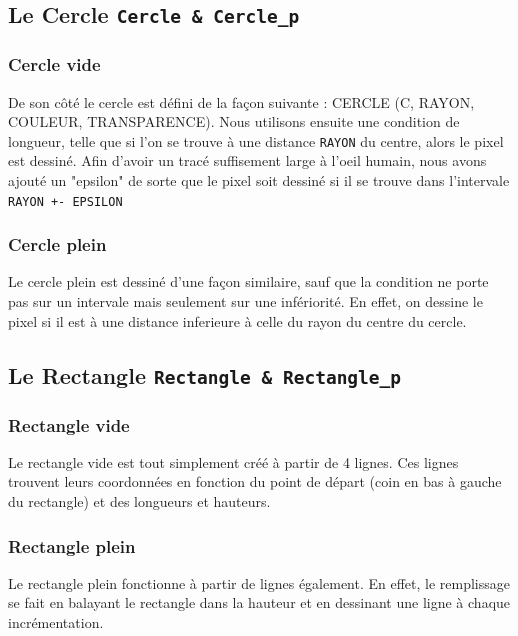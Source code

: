 \documentclass[11pt]{article}
\begin{document}
\subsection{Le Cercle \texttt{Cercle \& Cercle\_p}}

\subsubsection{Cercle vide}

De son côté le cercle est défini de la façon suivante : CERCLE (C, RAYON, COULEUR, TRANSPARENCE). Nous utilisons ensuite une condition de longueur, telle que si l'on se trouve à une distance \texttt{RAYON} du centre, alors le pixel est dessiné. Afin d'avoir un tracé suffisement large à l'oeil humain, nous avons ajouté un "epsilon" de sorte que le pixel soit dessiné si il se trouve dans l'intervale \texttt{RAYON +- EPSILON}

\subsubsection{Cercle plein}

Le cercle plein est dessiné d'une façon similaire, sauf que la condition ne porte pas sur un intervale mais seulement sur une infériorité. En effet, on dessine le pixel si il est à une distance inferieure à celle du rayon du centre du cercle.

\subsection{Le Rectangle \texttt{Rectangle \& Rectangle\_p}}

\subsubsection{Rectangle vide}

Le rectangle vide est tout simplement créé à partir de 4 lignes. Ces lignes trouvent leurs coordonnées en fonction du point de départ (coin en bas à gauche du rectangle) et des longueurs et hauteurs.

\subsubsection{Rectangle plein}

Le rectangle plein fonctionne à partir de lignes également. En effet, le remplissage se fait en balayant le rectangle dans la hauteur et en dessinant une ligne à chaque incrémentation.
\end{document}
